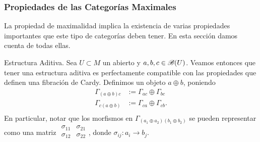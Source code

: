 {\subsubsection{{\small Propiedades de las Categor\'ias Maximales}}

La propiedad de maximalidad implica la existencia de varias propiedades importantes que este tipo de categor\'ias deben tener. En esta secci\'on damos cuenta de todas ellas.
\medskip

{\sc Estructura Aditiva.} Sea $U\subset M$ un abierto y $a,b,c\in \mathscr{B}(U)$. Veamos entonces que tener una estructura aditiva es perfectamente compatible con las propiedades que definen una fibraci\'on de Cardy. Definimos un objeto $a\oplus b$, poniendo
$$
\begin{aligned}
\Gamma_{(a\oplus b)c} &:= \Gamma_{ac}\oplus \Gamma_{bc} \\
\Gamma_{c(a\oplus b)} &:= \Gamma_{ca}\oplus \Gamma_{cb}. \\
\end{aligned}
$$
En particular, notar que los morfismos en $\Gamma_{(a_1\oplus a_2)(b_1\oplus b_2)}$ se pueden representar como una matriz $\begin{smallmatrix} \sigma_{11} & \sigma_{21} \\ \sigma_{12} & \sigma_{22} \\ \end{smallmatrix}$, donde $\sigma_{ij}:a_i\to b_j$.

}
